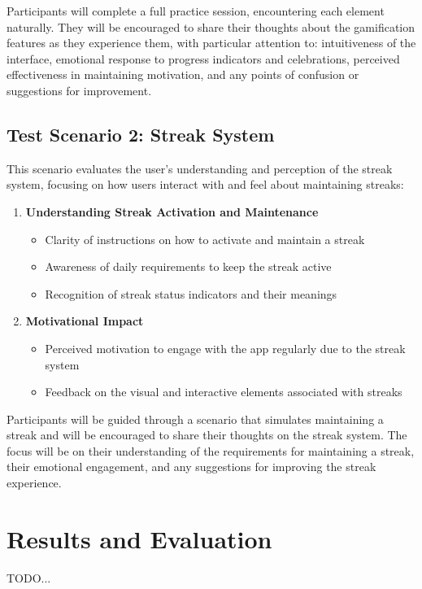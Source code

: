 Participants will complete a full practice session, encountering each element naturally. They will be encouraged to share their thoughts about the gamification features as they experience them, with particular attention to: intuitiveness of the interface, emotional response to progress indicators and celebrations, perceived effectiveness in maintaining motivation, and any points of confusion or suggestions for improvement.

\subsection*{Test Scenario 2: Streak System}

This scenario evaluates the user's understanding and perception of the streak system, focusing on how users interact with and feel about maintaining streaks:

\begin{enumerate}
    \item \textbf{Understanding Streak Activation and Maintenance}
    \begin{itemize}
        \item Clarity of instructions on how to activate and maintain a streak
        \item Awareness of daily requirements to keep the streak active
        \item Recognition of streak status indicators and their meanings
    \end{itemize}

    \item \textbf{Motivational Impact}
    \begin{itemize}
        \item Perceived motivation to engage with the app regularly due to the streak system
        \item Feedback on the visual and interactive elements associated with streaks
    \end{itemize}
\end{enumerate}

Participants will be guided through a scenario that simulates maintaining a streak and will be encouraged to share their thoughts on the streak system. The focus will be on their understanding of the requirements for maintaining a streak, their emotional engagement, and any suggestions for improving the streak experience.

\section{Results and Evaluation}

TODO...
